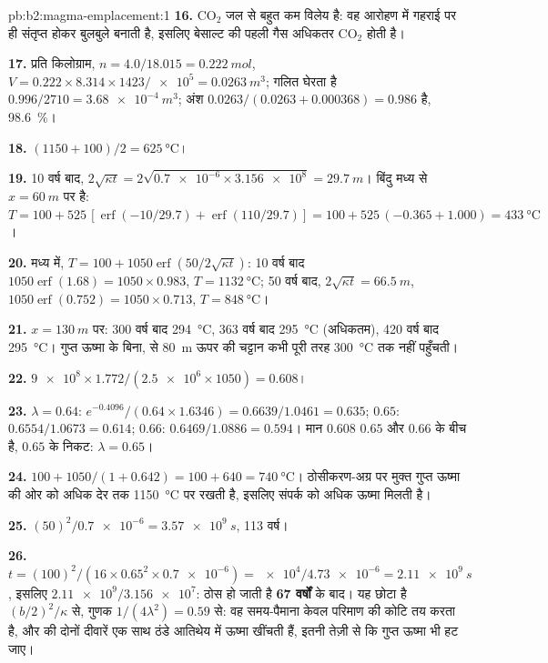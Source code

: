 \begin{solution}{pb:b2:magma-emplacement:1}
\textbf{16.} CO$_2$ जल से बहुत कम विलेय है: वह आरोहण में गहराई पर ही संतृप्त होकर
बुलबुले बनाती है, इसलिए बेसाल्ट की पहली गैस अधिकतर CO$_2$ होती है।

\textbf{17.} प्रति किलोग्राम, $n = 4.0/18.015 = \qty{0.222}{mol}$, $V = 0.222\times8.314\times1423/
\num{e5} = \qty{0.0263}{m^3}$; गलित घेरता है $0.996/2710 = \qty{3.68e-4}{m^3}$;
अंश $0.0263/(0.0263 + 0.000368) = 0.986$ है, \qty{98.6}{\percent}।

\textbf{18.} $(1150 + 100)/2 = \qty{625}{\celsius}$।

\textbf{19.} 10 वर्ष बाद, $2\sqrt{\kappa t} = 2\sqrt{\num{0.7e-6}\times\num{3.156e8}} =
\qty{29.7}{m}$। बिंदु मध्य से $x = \qty{60}{m}$ पर है: $T = 100 +
525\,[\operatorname{erf}(-10/29.7) + \operatorname{erf}(110/29.7)] = 100 + 525\,(-0.365 +
1.000) = \qty{433}{\celsius}$।

\textbf{20.} मध्य में, $T = 100 + 1050\operatorname{erf}(50/2\sqrt{\kappa t})$:
10 वर्ष बाद $1050\operatorname{erf}(1.68) = 1050\times0.983$, $T = \qty{1132}{\celsius}$;
50 वर्ष बाद, $2\sqrt{\kappa t} = \qty{66.5}{m}$, $1050\operatorname{erf}(0.752) = 1050\times0.713$,
$T = \qty{848}{\celsius}$।

\textbf{21.} $x = \qty{130}{m}$ पर: 300 वर्ष बाद \qty{294}{\celsius},
363 वर्ष बाद \qty{295}{\celsius} (अधिकतम), 420 वर्ष बाद \qty{295}{\celsius}।
गुप्त ऊष्मा के बिना,  से \qty{80}{m} ऊपर की चट्टान कभी पूरी तरह
\qty{300}{\celsius} तक नहीं पहुँचती।

\textbf{22.} $\num{9e8}\times1.772/(\num{2.5e6}\times1050) = 0.608$।

\textbf{23.} $\lambda = 0.64$: $e^{-0.4096}/(0.64\times1.6346) = 0.6639/1.0461 = 0.635$;
$0.65$: $0.6554/1.0673 = 0.614$; $0.66$: $0.6469/1.0886 = 0.594$। मान $0.608$
$0.65$ और $0.66$ के बीच है, $0.65$ के निकट: $\lambda = 0.65$।

\textbf{24.} $100 + 1050/(1 + 0.642) = 100 + 640 = \qty{740}{\celsius}$। ठोसीकरण-अग्र पर
मुक्त गुप्त ऊष्मा  की ओर को अधिक देर तक
\qty{1150}{\celsius} पर रखती है, इसलिए संपर्क को अधिक ऊष्मा मिलती है।

\textbf{25.} $(50)^2/\num{0.7e-6} = \qty{3.57e9}{s}$, 113 वर्ष।

\textbf{26.} $t = (100)^2/(16\times0.65^2\times\num{0.7e-6}) = \num{e4}/\num{4.73e-6} =
\qty{2.11e9}{s}$, इसलिए $\num{2.11e9}/\num{3.156e7}$:  ठोस हो जाती है
\textbf{\qty[text-series-to-math=true]{67}{} वर्षों} के बाद। यह छोटा है
$(b/2)^2/\kappa$ से, गुणक $1/(4\lambda^2) = 0.59$ से: वह समय-पैमाना केवल
परिमाण की कोटि तय करता है, और  की दोनों दीवारें एक साथ ठंडे आतिथेय में ऊष्मा
खींचती हैं, इतनी तेज़ी से कि गुप्त ऊष्मा भी हट जाए।
\end{solution}
